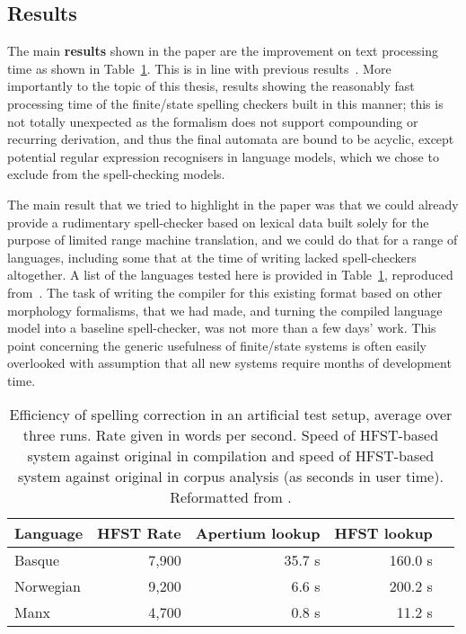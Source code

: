 \documentclass[officiallayout,final]{unihelcompling}
\begin{document}
\subsection{Results}

The main \textbf{results} shown in the paper are the improvement on text
processing time as shown in Table~\ref{table:lrec-2012-repro}. This is in line
with previous results~\citep{silfverberg2009hfst}. More importantly to the
topic of this thesis, results showing the reasonably fast processing time of
the finite\-/state spelling checkers built in this manner; this is not totally
unexpected as the \gls{formalism} does not support compounding or recurring
derivation, and thus the final automata are bound to be acyclic, except
potential regular expression recognisers in language models, which we chose to
exclude from the spell-checking models.

The main result that we tried to highlight in the paper was that we could
already provide a rudimentary spell-checker based on lexical data built solely
for the purpose of limited range machine translation, and we could do that for
a range of languages, including some that at the time of writing lacked
spell-checkers altogether. A list of the languages tested here is provided in
Table~\ref{table:lrec-2012-repro}, reproduced
from~. The task of writing the compiler for
this existing format based on other morphology \glspl{formalism}, that we had
made, and turning the compiled language model into a baseline spell-checker,
was not more than a few days' work. This point concerning the generic
usefulness of finite\-/state systems is often easily overlooked with assumption
that all new systems require months of development time.

\begin{table}
    \centering
    \begin{small}
\begin{tabular}{|l|r|r|r|r|}
\hline
\bf Language & \bf HFST Rate & \bf Apertium lookup & \bf HFST lookup \\
\hline
Basque       &  7,900  & 35.7 s & 160.0  s \\
Norwegian    &  9,200  & 6.6 s  & 200.2 s  \\
Manx         &  4,700  & 0.8 s  & 11.2  s  \\
\hline
\end{tabular}
\end{small}
  \caption{Efficiency of spelling correction in an artificial test setup,
      average over three runs. Rate given in words per second.  Speed of
      HFST-based system against original in compilation and speed of HFST-based
      system against original in corpus analysis (as seconds in user time).
  Reformatted from .
  \label{table:lrec-2012-repro}}
\end{table}
\end{document}
